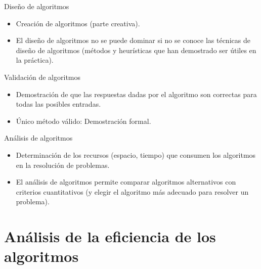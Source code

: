 \begin{frame}[c]{Diseño de algoritmos}
  \begin{itemize}
    \item Creación de algoritmos (parte creativa).
      \vspace{\baselineskip}
    \item El diseño de algoritmos no se puede dominar si no se conoce las
      técnicas de diseño de algoritmos (métodos y heurísticas que han demostrado
      ser útiles en la práctica).
  \end{itemize}
\end{frame}

\begin{frame}[c]{Validación de algoritmos}
  \begin{itemize}
    \item Demostración de que las respuestas dadas por el algoritmo son correctas
      para todas las posibles entradas.
      \vspace{\baselineskip}
    \item Único método válido: Demostración formal.
  \end{itemize}
\end{frame}

\begin{frame}[c]{Análisis de algoritmos}
  \begin{itemize}
    \item Determinación de los recursos (espacio, tiempo) que consumen los
      algoritmos en la resolución de problemas.
      \vspace{\baselineskip}
    \item El análisis de algoritmos permite comparar algoritmos alternativos
      con criterios cuantitativos (y elegir el algoritmo más adecuado para
      resolver un problema).
  \end{itemize}
\end{frame}

\section{Análisis de la eficiencia de los algoritmos}


